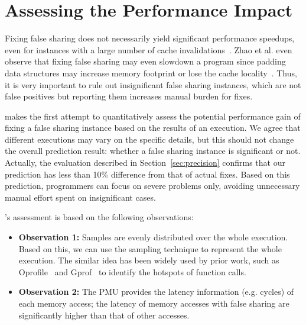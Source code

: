 \section{Assessing the Performance Impact}

\label{sec:predictimprove}
Fixing false sharing does not necessarily yield significant performance speedups, even for instances with a large number of cache invalidations~\cite{Sheriff, Predator}. Zhao et al. even observe that fixing false sharing may even slowdown a program since padding data structures may increase memory footprint or lose the cache locality~\cite{qinzhao}. Thus, it is very important to rule out insignificant false sharing instances, which are not false positives but reporting them increases manual burden for fixes.

\cheetah{} makes the first attempt to quantitatively assess the potential performance gain of fixing a false sharing instance based on the results of an execution. We agree that different executions may vary on the specific details, but this should not change the overall prediction result: whether a false sharing instance is significant or not. Actually, the evaluation described in Section~\ref{sec:precision} confirms that our prediction has less than 10\% difference from that of actual fixes. Based on this prediction, programmers can focus on severe problems only, avoiding unnecessary manual effort spent on insignificant cases.

\cheetah{}'s assessment is based on the following observations:

\begin{itemize}
\item {\bf Observation 1:} Samples are evenly distributed over the whole execution. Based on this, we can use the sampling technique to represent the whole execution. The similar idea has been widely used by prior work, such as Oprofile~\cite{oprofile} and Gprof~\cite{DBLP:conf/sigplan/GrahamKM82} to identify the hotspots of function calls.

\item {\bf Observation 2:} The PMU provides the latency information (e.g. cycles) of each memory access; the latency of memory accesses with false sharing are significantly higher than that of other accesses. 

\end{itemize}

